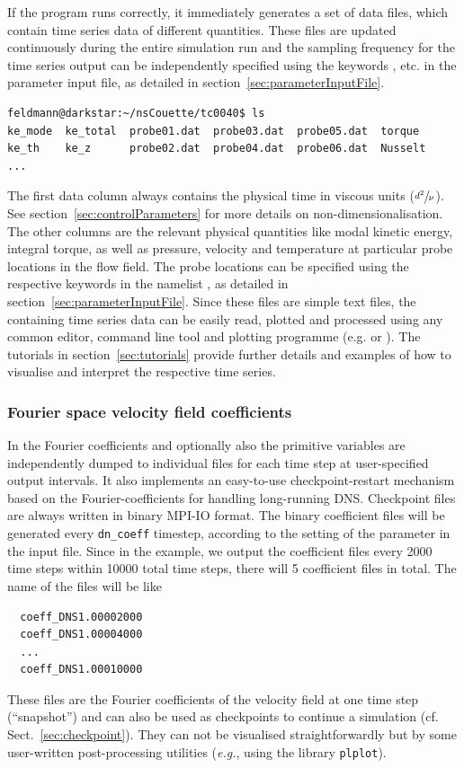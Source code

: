 \documentclass[a4paper, 11pt, DIV=11]{scrartcl}
\begin{document}
If the program runs correctly, it immediately generates a set of data
files, which contain time series data of different quantities. These
files are updated continuously during the entire simulation run and
the sampling frequency for the time series output can be independently
specified using the keywords ,  etc. in the
parameter input file, as detailed in section~\ref{sec:parameterInputFile}.
\begin{lstlisting}[language=bash]
feldmann@darkstar:~/nsCouette/tc0040$ ls
ke_mode  ke_total  probe01.dat  probe03.dat  probe05.dat  torque
ke_th    ke_z      probe02.dat  probe04.dat  probe06.dat  Nusselt
...
\end{lstlisting}
The first data column always contains the physical time in viscous units
($\sfrac{d^2}{\nu}$). See section~\ref{sec:controlParameters} for more
details on non-dimensionalisation. The other columns are the relevant
physical quantities like modal kinetic energy, integral torque, as well
as pressure, velocity and temperature at particular probe locations in the
flow field. The probe locations can be specified using the respective
keywords in the namelist , as detailed in
section~\ref{sec:parameterInputFile}. Since these files are simple
text files, the containing time series data can be easily read, plotted and
processed using any common editor, command line tool and plotting
programme (e.g.  or ). The tutorials in
section~\ref{sec:tutorials} provide further details and examples of how
to visualise and interpret the respective time series.

\subsubsection{Fourier space velocity field coefficients}
\label{sec:ioCoeff}

In \nsc the Fourier coefficients and optionally also the primitive variables are
independently dumped to individual files for each time step at user-specified 
output intervals. It also implements an easy-to-use checkpoint-restart mechanism 
based on the Fourier-coefficients for handling long-running DNS.
Checkpoint files are always written in binary MPI-IO format.
The binary coefficient files will be generated every \verb+dn_coeff+
timestep, according to the setting of the parameter in the input
file. Since in the example, we output the coefficient files every 2000 time steps within 
10000 total time steps, there will 5 coefficient files in total.
The name of the files will be like 
\begin{verbatim}
  coeff_DNS1.00002000
  coeff_DNS1.00004000
  ...  
  coeff_DNS1.00010000
\end{verbatim}
These files are the Fourier coefficients of the velocity field at one 
time step (``snapshot'') and can also be used as checkpoints to
continue a simulation (cf. Sect.~\ref{sec:checkpoint}). They can not be visualised straightforwardly but 
by some user-written post-processing utilities (\textit{e.g.}, using the library \verb+plplot+). 
\end{document}
